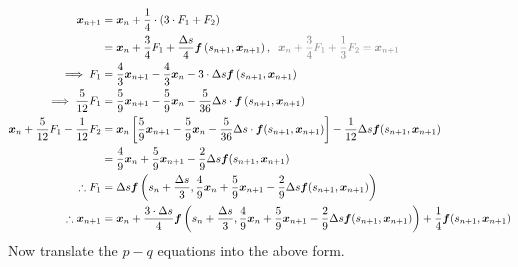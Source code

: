 \documentclass{article}
\begin{document}
\begin{align*}
	\bm{x}_{n+1}                               & = \bm{x}_n + \frac{1}{4}\cdot(3\cdot F_1 + F_2)                                                                                                                                                                             \\
	                                           & = \bm{x}_n + \frac{3}{4}F_1 + \frac{\Delta s}{4}\bm{f}\left(s_{n+1}, \bm{x}_{n+1}\right),\;\;\textcolor{gray}{\bm{x}_n+\frac{3}{4}F_1+\frac{1}{3}F_2=\bm{x}_{n+1}}                                                          \\
	\implies F_1                               & = \frac{4}{3}\bm{x}_{n+1}-\frac{4}{3}\bm{x}_n-3\cdot\Delta s\bm{f}\left(s_{n+1}, \bm{x}_{n+1}\right)                                                                                                                        \\
	\implies \frac{5}{12}F_1                   & = \frac{5}{9}\bm{x}_{n+1}-\frac{5}{9}\bm{x}_n-\frac{5}{36}\Delta s\cdot \bm{f}\left(s_{n+1}, \bm{x}_{n+1}\right)                                                                                                            \\
	\bm{x}_n + \frac{5}{12}F_1-\frac{1}{12}F_2 & = \bm{x}_n \left[\frac{5}{9}\bm{x}_{n+1}-\frac{5}{9}\bm{x}_n-\frac{5}{36}\Delta s\cdot \bm{f}(s_{n+1}, \bm{x}_{n+1}) \right]-\frac{1}{12}\Delta s \bm{f}(s_{n+1}, \bm{x}_{n+1})                                             \\
	                                           & = \frac{4}{9}\bm{x}_n+\frac{5}{9}\bm{x}_{n+1}-\frac{2}{9}\Delta s \bm{f}(s_{n+1}, \bm{x}_{n+1})                                                                                                                             \\
	\therefore F_1                             & = \Delta s \bm{f}\left(s_{n}+\frac{\Delta s}{3}, \frac{4}{9}\bm{x}_n+\frac{5}{9}\bm{x}_{n+1}-\frac{2}{9}\Delta s \bm{f}(s_{n+1}, \bm{x}_{n+1})\right)                                                                       \\
	\therefore \bm{x}_{n+1}                    & = \bm{x}_n + \frac{3\cdot \Delta s}{4}\bm{f}\left(s_{n}+\frac{\Delta s}{3}, \frac{4}{9}\bm{x}_n+\frac{5}{9}\bm{x}_{n+1}-\frac{2}{9}\Delta s \bm{f}(s_{n+1}, \bm{x}_{n+1})\right) + \frac{1}{4}\bm{f}(s_{n+1}, \bm{x}_{n+1})
\end{align*}
Now translate the $p-q$ equations into the above form.
\end{document}
